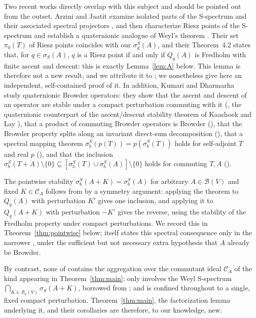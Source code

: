 \documentclass[11pt,a4paper]{article}
\theoremstyle{plain}
\theoremstyle{remark}
\newcommand{\V}{V}
\newcommand{\B}{\mathcal B}
\newcommand{\Bo}{\mathcal B_0}
\newcommand{\CA}{\mathcal C_A}
\newcommand{\sS}{\sigma_S}
\newcommand{\sigb}{\sigma_b^S}
\newcommand{\sd}{\sigma_d^S}
\newcommand{\Qq}[1]{Q_q(#1)}
\begin{document}
Two recent works directly overlap with this subject and should be pointed out from the outset. Arzini and Jaatit examine isolated parts of the S-spectrum and their associated spectral projectors \cite{AJ25}, and then characterize Riesz points of the S-spectrum and establish a quaternionic analogue of Weyl's theorem \cite{AJ26}. Their set $\pi_0(T)$ of Riesz points coincides with our $\sd(A)$, and their Theorem~4.2 states that, for $q\in\sS(A)$, $q$ is a Riesz point if and only if $\Qq{A}$ is Fredholm with finite ascent and descent: this is exactly Lemma~\ref{lem:A} below. This lemma is therefore not a new result, and we attribute it to \cite{AJ26}; we nonetheless give here an independent, self-contained proof of it. In addition, Kumari and Dharmarha \cite{KD24} study quaternionic Browder operators: they show that the ascent and descent of an operator are stable under a compact perturbation commuting with it (\cite[Thm~3.9]{KD24}, the quaternionic counterpart of the ascent/descent stability theorem of Kaashoek and Lay \cite{KL72}), that a product of commuting Browder operators is Browder (\cite[Prop.~4.1]{KD24}), that the Browder property splits along an invariant direct-sum decomposition (\cite[Thm~4.4]{KD24}), that a spectral mapping theorem $\sigb(p(T))=p(\sigb(T))$ holds for self-adjoint $T$ and real $p$ (\cite[Thm~4.8]{KD24}), and that the inclusion $\sigb(T+A)\setminus\{0\}\subseteq[\sigb(T)\cup\sigb(A)]\setminus\{0\}$ holds for commuting $T,A$ (\cite[Thm~4.9]{KD24}).

The pointwise stability $\sigb(A+K)=\sigb(A)$ for arbitrary $A\in\B(\V)$ and fixed $K\in\CA$ follows from \cite[Thm~3.9]{KD24} by a symmetry argument: applying the theorem to $\Qq{A}$ with perturbation $K'$ gives one inclusion, and applying it to $\Qq{A+K}$ with perturbation $-K'$ gives the reverse, using the stability of the Fredholm property under compact perturbations. We record this in Theorem~\ref{thm:pointwise} below; \cite{KD24} itself states this spectral consequence only in the narrower \cite[Cor.~3.10]{KD24}, under the sufficient but not necessary extra hypothesis that $A$ already be Browder.

By contrast, none of \cite{AJ25,AJ26,KD24} contains the aggregation over the commutant ideal $\CA$ of the kind appearing in Theorem~\ref{thm:main}: \cite{AJ26} only involves the Weyl S-spectrum $\bigcap_{K\in\Bo(\V)}\sS(A+K)$, borrowed from \cite{MT19}; and \cite{KD24} is confined throughout to a single, fixed compact perturbation. Theorem~\ref{thm:main}, the factorization lemma underlying it, and their corollaries are therefore, to our knowledge, new.
\end{document}
